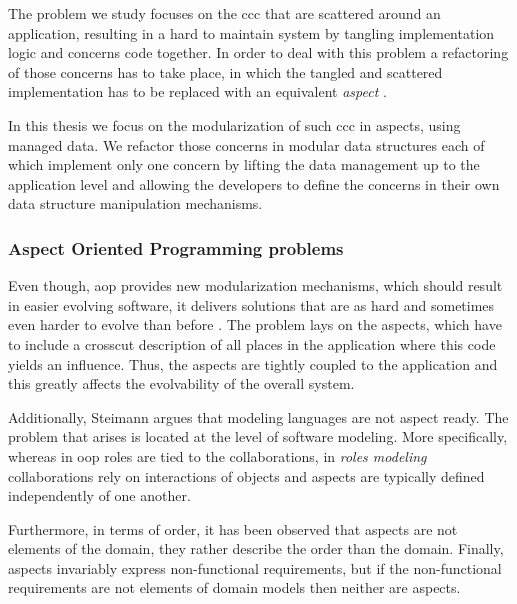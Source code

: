 The problem we study focuses on the \ac{ccc} that are scattered around an application, resulting in a hard to maintain system by tangling implementation logic and concerns code together. 
In order to deal with this problem a refactoring of those concerns has to take place, in which the tangled and scattered implementation has to be replaced with an equivalent \textit{aspect} \cite{hannemann2005role}.

In this thesis we focus on the modularization of such \ac{ccc} in aspects, using managed data. 
We refactor those concerns in modular data structures each of which implement only one concern by lifting the data management up to the application level and allowing the developers to define the concerns in their own data structure manipulation mechanisms.

\subsubsection{Aspect Oriented Programming problems}\label{Aspect Oriented Programming problem}

Even though, \ac{aop} provides new modularization mechanisms, which should result in easier evolving software, 
it delivers solutions that are as hard and sometimes even harder to evolve than before \cite{tourwe2003existence}. 
The problem lays on the aspects, which have to include a crosscut description of all places in the application where this code yields an influence. 
Thus, the aspects are tightly coupled to the application and this greatly affects the evolvability of the overall system. 

Additionally, Steimann \cite{steimann2005domain} argues that modeling languages are not aspect ready. 
The problem that arises is located at the level of software modeling. 
More specifically, whereas in \ac{oop} roles are tied to the collaborations, in \textit{roles modeling} collaborations rely on interactions of objects and aspects are typically defined independently of one another.

Furthermore, in terms of order, it has been observed that aspects are not elements of the domain, they rather describe the order than the domain. 
Finally, aspects invariably express non-functional requirements, but if the non-functional requirements are not elements of domain models then neither are aspects.

